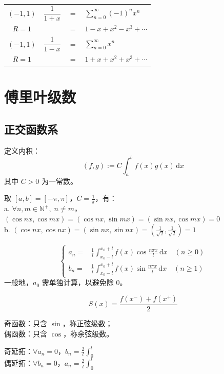 \documentclass[12pt, a4paper, UTF8, openany]{ctexbook}
\newcommand{\dif}{\mathrm{d}}
\newcommand{\sdif}{\,\dif}
\newcommand{\field}[1]{\mathbb{#1}}%
\begin{document}
\begin{longtable}[h]{c | c c l}
            \addlinespace
            \addlinespace

            $(-1, 1)$ & $\dfrac{1}{1 + x}$ & $=$ &
            {\large $\sum\limits_{n = 0}^{\infty} (-1)^n x^n$} \\
            $R = 1$ & & $=$ &
            {\large $1 - x + x^2 - x^3 + \cdots$} \\
            
            \addlinespace
            \addlinespace

            $(-1, 1)$ & $\dfrac{1}{1 - x}$ & $=$ &
            {\large $\sum\limits_{n = 0}^{\infty}  x^n$} \\
            $R = 1$ & & $=$ &
            {\large $1 + x + x^2 + x^3 + \cdots$} \\
        \end{longtable}

    \section{傅里叶级数}
        \subsection{正交函数系}
        定义内积：
        $$(f, g) := C \int_{a}^{b} f(x) g(x) \sdif x$$
        其中 $C > 0$ 为一常数。

        取 $[a, b] = [-\pi, \pi]$，$C = \frac{1}{\pi}$，有：\\
        a. $\forall n, m \in \field{N}^+, \; n \neq m$，$(\cos nx, \cos mx) = (\cos nx, \sin mx) = (\sin nx, \cos mx) = 0$ \\
        b. $(\cos nx, \cos nx) = (\sin nx, \sin nx) = (\frac{1}{\sqrt{2}}, \frac{1}{\sqrt{2}}) = 1$

    $$\begin{cases}
        a_n = &\frac{1}{l} \int_{x_0 - l}^{x_0 + l} f(x) \cos \frac{n \pi x}{l} \sdif x \quad (n \geqslant 0) \\
        b_n = &\frac{1}{l} \int_{x_0 - l}^{x_0 + l} f(x) \sin \frac{n \pi x}{l} \sdif x \quad (n \geqslant 1) 
    \end{cases}$$
    一般地，$a_0$ 需单独计算，以避免除 0。

    $$S(x) = \frac{f(x^-) + f(x^+)}{2}$$

    奇函数：只含 $\sin$，称正弦级数；\\
    偶函数：只含 $\cos$，称余弦级数。

    奇延拓：$\forall a_n = 0$，$b_n = \frac{2}{l} \int_{0}^{l}$ \\
    偶延拓：$\forall b_n = 0$，$a_n = \frac{2}{l} \int_{0}^{l}$
\end{document}

